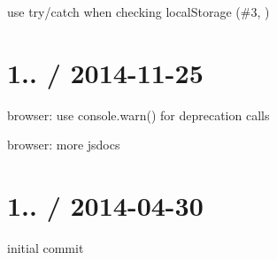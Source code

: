 
\begin{DoxyItemize}
\item use try/catch when checking {\ttfamily local\+Storage} (\#3, )
\end{DoxyItemize}

\section*{1.. / 2014-\/11-\/25 }


\begin{DoxyItemize}
\item browser\+: use {\ttfamily console.\+warn()} for deprecation calls
\item browser\+: more jsdocs
\end{DoxyItemize}

\section*{1.. / 2014-\/04-\/30 }


\begin{DoxyItemize}
\item initial commit 
\end{DoxyItemize}